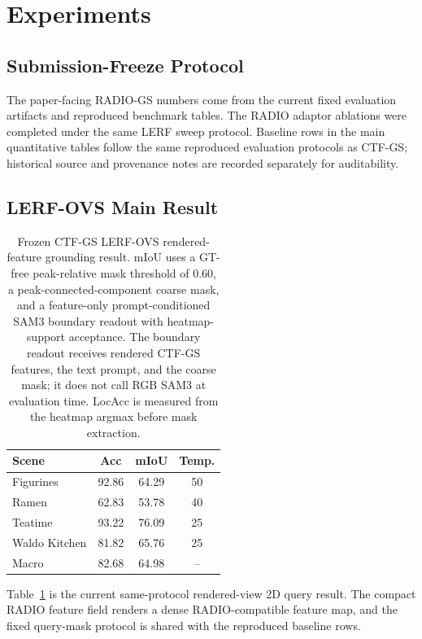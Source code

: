 \documentclass[10pt,twocolumn,letterpaper]{article}
\newcommand{\method}{CTF-GS}
\newcommand{\project}{RADIO-GS}
\begin{document}
\section{Experiments}

\subsection{Submission-Freeze Protocol}

The paper-facing \project{} numbers come from the current fixed evaluation
artifacts and reproduced benchmark tables. The RADIO adaptor ablations were
completed under the same LERF sweep protocol. Baseline rows in the main
quantitative tables follow the same reproduced evaluation protocols as
\method{}; historical source and provenance notes are recorded separately for
auditability.

\subsection{LERF-OVS Main Result}

\begin{table}[t]
\centering
\caption{Frozen \method{} LERF-OVS rendered-feature grounding result. mIoU uses a GT-free peak-relative mask threshold of 0.60, a peak-connected-component coarse mask, and a feature-only prompt-conditioned SAM3 boundary readout with heatmap-support acceptance. The boundary readout receives rendered \method{} features, the text prompt, and the coarse mask; it does not call RGB SAM3 at evaluation time. LocAcc is measured from the heatmap argmax before mask extraction.}
\label{tab:lerf}
\begin{tabular}{lccc}
\toprule
Scene & Acc & mIoU & Temp. \\
\midrule
Figurines & 92.86 & 64.29 & 50 \\
Ramen & 62.83 & 53.78 & 40 \\
Teatime & 93.22 & 76.09 & 25 \\
Waldo Kitchen & 81.82 & 65.76 & 25 \\
\midrule
Macro & 82.68 & 64.98 & -- \\
\bottomrule
\end{tabular}
\end{table}

Table~\ref{tab:lerf} is the current same-protocol rendered-view 2D query result.
The compact RADIO feature field renders a dense RADIO-compatible feature map,
and the fixed query-mask protocol is shared with the reproduced baseline rows.
\end{document}
